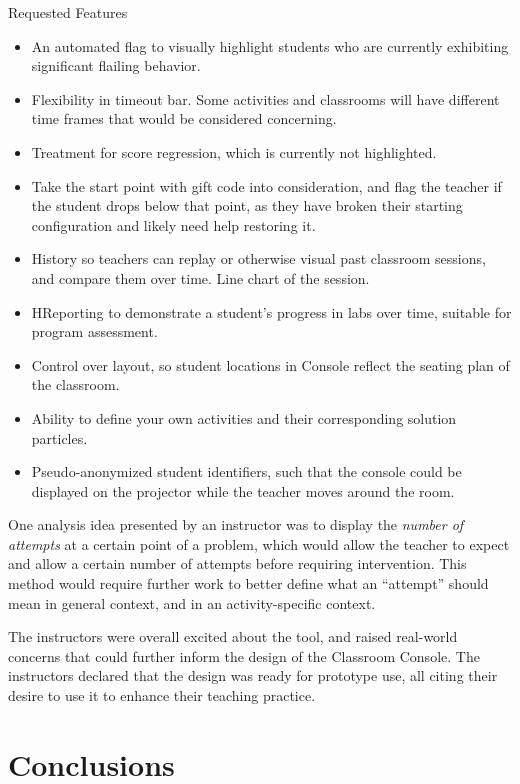 Requested Features
\begin{itemize}
\item An automated flag to visually highlight students who are currently exhibiting significant flailing behavior.
\item Flexibility in timeout bar. Some activities and classrooms will have different time frames that would be considered concerning.
\item Treatment for score regression, which is currently not highlighted. 
\item Take the start point with gift code into consideration, and flag the teacher if the student drops below that point, as they have broken their starting configuration and likely need help restoring it.
\item History so teachers can replay or otherwise visual past classroom sessions, and compare them over time. Line chart of the session.
\item HReporting to demonstrate a student's progress in labs over time, suitable for program assessment. 
\item Control over layout, so student locations in Console reflect the seating plan of the classroom.
\item Ability to define your own activities and their corresponding solution particles.
\item Pseudo-anonymized student identifiers, such that the console could be displayed on the projector while the teacher moves around the room.
\end{itemize}

One analysis idea presented by an instructor was to display the \emph{number of attempts} at a certain point of a problem, which would allow the teacher to expect and allow a certain number of attempts before requiring intervention. This method would require further work to better define what an ``attempt'' should mean in general context, and in an activity-specific context.

The instructors were overall excited about the tool, and raised real-world concerns that could further inform the design of the Classroom Console. The instructors declared that the design was ready for prototype use, all citing their desire to use it to enhance their teaching practice.

\section{Conclusions}

